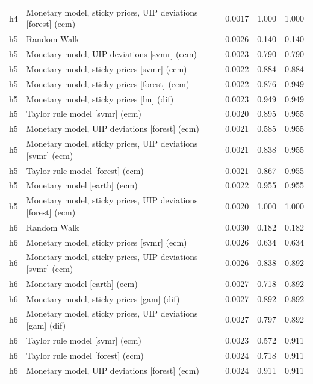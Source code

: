 \begin{ThreePartTable}
\begin{longtable}[t]{cp{5.5cm}ccc}
h4 & \raggedright Monetary model, sticky prices, UIP deviations [forest] (ecm) & 0.0017 & 1.000 & 1.000\\
\addlinespace
h5 & \raggedright Random Walk & 0.0026 & 0.140 & 0.140\\
h5 & \raggedright Monetary model, UIP deviations [svmr] (ecm) & 0.0023 & 0.790 & 0.790\\
h5 & \raggedright Monetary model, sticky prices [svmr] (ecm) & 0.0022 & 0.884 & 0.884\\
h5 & \raggedright Monetary model, sticky prices [forest] (ecm) & 0.0022 & 0.876 & 0.949\\
h5 & \raggedright Monetary model, sticky prices [lm] (dif) & 0.0023 & 0.949 & 0.949\\
h5 & \raggedright Taylor rule model [svmr] (ecm) & 0.0020 & 0.895 & 0.955\\
h5 & \raggedright Monetary model, UIP deviations [forest] (ecm) & 0.0021 & 0.585 & 0.955\\
h5 & \raggedright Monetary model, sticky prices, UIP deviations [svmr] (ecm) & 0.0021 & 0.838 & 0.955\\
h5 & \raggedright Taylor rule model [forest] (ecm) & 0.0021 & 0.867 & 0.955\\
h5 & \raggedright Monetary model [earth] (ecm) & 0.0022 & 0.955 & 0.955\\
h5 & \raggedright Monetary model, sticky prices, UIP deviations [forest] (ecm) & 0.0020 & 1.000 & 1.000\\
\addlinespace
h6 & \raggedright Random Walk & 0.0030 & 0.182 & 0.182\\
h6 & \raggedright Monetary model, sticky prices [svmr] (ecm) & 0.0026 & 0.634 & 0.634\\
h6 & \raggedright Monetary model, sticky prices, UIP deviations [svmr] (ecm) & 0.0026 & 0.838 & 0.892\\
h6 & \raggedright Monetary model [earth] (ecm) & 0.0027 & 0.718 & 0.892\\
h6 & \raggedright Monetary model, sticky prices [gam] (dif) & 0.0027 & 0.892 & 0.892\\
h6 & \raggedright Monetary model, sticky prices, UIP deviations [gam] (dif) & 0.0027 & 0.797 & 0.892\\
h6 & \raggedright Taylor rule model [svmr] (ecm) & 0.0023 & 0.572 & 0.911\\
h6 & \raggedright Taylor rule model [forest] (ecm) & 0.0024 & 0.718 & 0.911\\
h6 & \raggedright Monetary model, UIP deviations [forest] (ecm) & 0.0024 & 0.911 & 0.911\\

\end{longtable}
\end{ThreePartTable}
